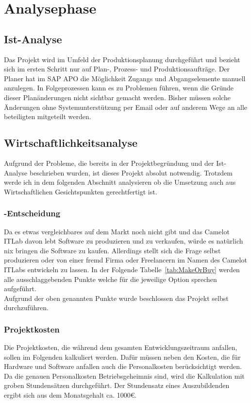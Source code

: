 \section{Analysephase} 
\label{sec:Analysephase}

\subsection{Ist-Analyse} 
\label{sec:IstAnalyse}
Das Projekt wird im Umfeld der Produktionsplanung durchgeführt und bezieht sich im ersten Schritt nur auf Plan-, Prozess- und Produktionsaufträge. Der Planer hat im SAP \ac{APO} die	Möglichkeit Zugangs und Abgangselemente manuell anzulegen. In Folgeprozessen kann es zu Problemen führen, wenn die Gründe dieser Planänderungen nicht sichtbar gemacht werden. Bisher müssen solche Änderungen ohne Systemunterstützung per Email oder auf anderem Wege an alle beteiligten mitgeteilt werden.

\subsection{Wirtschaftlichkeitsanalyse}
\label{sec:Wirtschaftlichkeitsanalyse}
Aufgrund der Probleme, die bereits in der Projektbegründung und der Ist-Analyse beschrieben wurden, ist dieses Projekt absolut notwendig. Trotzdem werde ich in dem folgenden Abschnitt analysieren ob die Umsetzung auch aus Wirtschaftlichen Gesichtspunkten gerechtfertigt ist.

\subsubsection{-Entscheidung}
\label{sec:MakeOrBuyEntscheidung}

Da es etwas vergleichbares auf dem Markt noch nicht gibt und das Camelot ITLab davon lebt Software zu produzieren und zu verkaufen, würde es natürlich nix bringen die Software zu kaufen. Allerdings stellt sich die Frage selbst produzieren oder von einer fremd Firma oder Freelancern im Namen des Camelot ITLabs entwickeln zu lassen. In der Folgende Tabelle~\ref{tab:MakeOrBuy} werden alle ausschlaggebenden Punkte welche für die jeweilige Option sprechen aufgeführt.
\\
Aufgrund der oben genannten Punkte wurde beschlossen das Projekt selbst durchzuführen.

\subsubsection{Projektkosten}
\label{sec:Projektkosten}
Die Projektkosten, die während dem gesamten Entwicklungszeitraum anfallen, sollen im Folgenden kalkuliert werden. Dafür müssen neben den Kosten, die für Hardware und Software anfallen auch die Personalkosten berücksichtigt werden. Da die genauen Personalkosten Betriebsgeheimnis sind, wird die Kalkulation mit groben Stundensätzen durchgeführt. Der Stundensatz eines Auszubildenden ergibt sich aus dem Monatsgehalt ca. 1000€.
		
